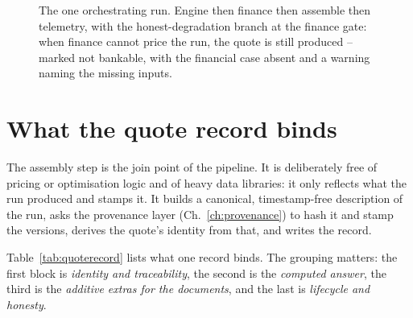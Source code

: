 \begin{figure}[H]
{}
\caption{The one orchestrating run. Engine then finance then assemble then telemetry, with the honest-degradation branch at the finance gate: when finance cannot price the run, the quote is still produced -- marked not bankable, with the financial case absent and a warning naming the missing inputs.}
\label{fig:quote-run}
\end{figure}

\section{What the quote record binds}

The assembly step is the join point of the pipeline. It is deliberately free of pricing or optimisation logic and of heavy data libraries: it only reflects what the run produced and stamps it. It builds a canonical, timestamp-free description of the run, asks the provenance layer (Ch.~\ref{ch:provenance}) to hash it and stamp the versions, derives the quote's identity from that, and writes the record.

Table~\ref{tab:quoterecord} lists what one record binds. The grouping matters: the first block is \emph{identity and traceability}, the second is the \emph{computed answer}, the third is the \emph{additive extras for the documents}, and the last is \emph{lifecycle and honesty}.

